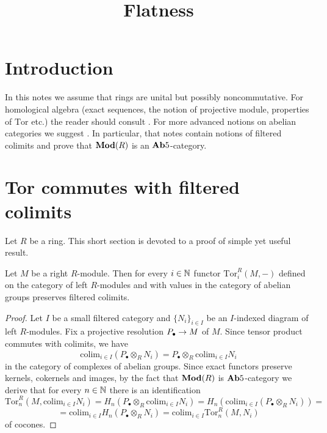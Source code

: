 



\title{Flatness}
\date{}
\maketitle
\section{Introduction}
\noindent
In this notes we assume that rings are unital but possibly noncommutative. For homological algebra (exact sequences, the notion of projective module, properties of $\mathrm{Tor}$ etc.) the reader should consult \cite{weibel1995introduction}. For more advanced notions on abelian categories we suggest \cite{AbelianCategoriesresults}. In particular, that notes contain notions of filtered colimits and prove that $\mathbf{Mod}(R)$ is an $\mathbf{Ab}5$-category.

\section{Tor commutes with filtered colimits}
Let $R$ be a ring. This short section is devoted to a proof of simple yet useful result.


\begin{proposition}\label{proposition:torpreservesfiltered}
Let $M$ be a right $R$-module. Then for every $i\in {\mathbb N}$ functor $\mathrm{Tor}^R_i(M,-)$ defined on the category of left $R$-modules and with values in the category of abelian groups preserves filtered colimits.
\end{proposition}
\begin{proof}
Let $I$ be a small filtered category and $\{N_i\}_{i\in I}$ be an $I$-indexed diagram of left $R$-modules. Fix a projective resolution $P_{\bullet}\rightarrow M$ of $M$. Since tensor product commutes with colimits, we have 
$$\mathrm{colim}_{i\in I}\left(P_{\bullet}\otimes_RN_i\right)=P_{\bullet}\otimes_R\mathrm{colim}_{i\in I}N_i$$
in the category of complexes of abelian groups. Since exact functors preserve kernels, cokernels and images, by the fact that $\mathbf{Mod}(R)$ is $\mathbf{Ab}5$-category we derive that for every $n\in {\mathbb N}$ there is an identification
$$\mathrm{Tor}^R_n\left(M,\mathrm{colim}_{i\in I}N_i\right)=H_n\left(P_{\bullet}\otimes_R\mathrm{colim}_{i\in I}N_i\right)=H_n\left(\mathrm{colim}_{i\in I}\left(P_{\bullet}\otimes_RN_i\right)\right)=$$
$$=\mathrm{colim}_{i\in I}H_n\left(P_{\bullet}\otimes_RN_i\right)=\mathrm{colim}_{i\in I}\mathrm{Tor}^R_n\left(M,N_i\right)$$
of cocones.
\end{proof}

